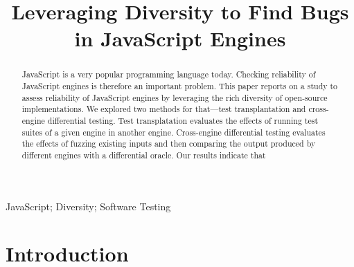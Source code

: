 \documentclass[10pt,conference,anonymous]{IEEEtran}
\begin{document}
\title{Leveraging Diversity to Find Bugs\\ in JavaScript Engines}


\maketitle

\thispagestyle{plain}
\pagestyle{plain}

\begin{abstract}
JavaScript is a very popular programming language today. Checking
reliability of JavaScript engines is therefore an important
problem. This paper reports on a study to assess reliability of
JavaScript engines by leveraging the rich diversity of open-source
implementations. We explored two methods for that---test
transplantation and cross-engine differential testing. Test
transplatation evaluates the effects of running test suites of a given
engine in another engine. Cross-engine differential testing evaluates
the effects of fuzzing existing inputs and then comparing the output
produced by different engines with a differential oracle. Our results
indicate that 
\end{abstract}

\begin{IEEEkeywords}
JavaScript; Diversity; Software Testing
\end{IEEEkeywords}

\section{Introduction}
\end{document}
